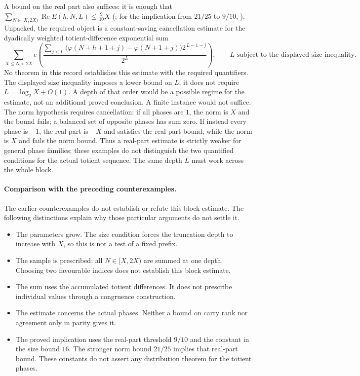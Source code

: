 A bound on the real part also suffices: it is enough that
$\sum_{N \in [X,2X)} \operatorname{Re}E(h,N,L) \le \tfrac{9}{10}X$
(;
for the implication from $21/25$ to $9/10$,
).
Unpacked, the required object is a constant-saving cancellation estimate for
the dyadically weighted totient-difference exponential sum
\[
  \sum_{X \le N < 2X}
  e\!\left(\frac{\sum_{j<L}\bigl(\varphi(N{+}h{+}1{+}j)-\varphi(N{+}1{+}j)\bigr)2^{\,L-1-j}}{2^{L}}\right),
  \qquad L \text{ subject to the displayed size inequality}.
\]
No theorem in this record establishes this estimate with the
required quantifiers. The displayed size inequality imposes a lower
bound on $L$; it does not require $L=\log_2X+O(1)$. A depth of that
order would be a possible regime for the estimate, not an additional
proved conclusion. A finite instance would not suffice.
The norm hypothesis requires cancellation: if all phases are $1$, the
norm is $X$ and the bound fails; a balanced set of opposite phases has
sum zero. If instead every phase is $-1$, the real part is $-X$ and
satisfies the real-part bound, while the norm is $X$ and fails the norm
bound. Thus a real-part estimate is strictly weaker for general phase
families; these examples do not distinguish the two quantified conditions
for the actual totient sequence. The same depth $L$ must work across the
whole block.

\paragraph{Comparison with the preceding counterexamples.} The earlier counterexamples do not establish or refute this block
estimate. The following distinctions explain why those particular arguments
do not settle it.


\begin{itemize}[leftmargin=*]
\item The parameters grow. The size condition forces the truncation depth
  to increase with $X$, so this is not a test of a fixed prefix.
\item The sample is prescribed: all $N\in[X,2X)$ are summed at one depth.
  Choosing two favourable indices does not establish this block estimate.
\item The sum uses the accumulated totient differences. It does not
  prescribe individual values through a congruence construction.
\item The estimate concerns the actual phases. Neither a bound on carry
  rank nor agreement only in parity gives it.
\item The proved implication uses the real-part threshold $9/10$ and the
  constant in the size bound $16$. The stronger norm bound $21/25$ implies that
  real-part bound. These constants do not assert any distribution theorem
  for the totient phases.
\end{itemize}


